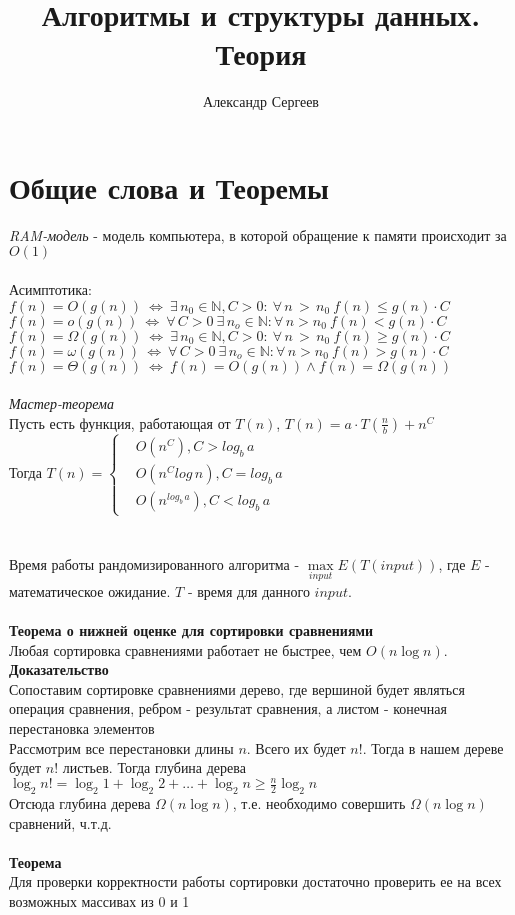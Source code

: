\documentclass[12pt]{article}
\title{Алгоритмы и структуры данных. Теория}
\author{Александр Сергеев}
\date{}
\begin{document}
\maketitle
\section{Общие слова и Теоремы}
\textit{RAM-модель} - модель компьютера, в которой обращение к памяти происходит за $O(1)$\\\\
Асимптотика:\\
$f(n) = O(g(n))\ \Leftrightarrow\ \exists\,n_0 \in \mathbb{N}, C > 0:\ \forall\,n\,>\,n_0\ f(n) \leq g(n)\cdot C$\\
$f(n) = o(g(n))\ \Leftrightarrow\ \forall\,C>0\ \exists\,n_o\in\mathbb{N}:\forall\,n>n_0\ f(n)<g(n)\cdot C$\\
$f(n) = \Omega(g(n))\ \Leftrightarrow\ \exists\,n_0 \in \mathbb{N}, C > 0:\ \forall\,n\,>\,n_0\ f(n) \geq g(n)\cdot C$\\
$f(n) = \omega(g(n))\ \Leftrightarrow\ \forall\,C>0\ \exists\,n_o\in\mathbb{N}:\forall\,n>n_0\ f(n)>g(n)\cdot C$\\
$f(n) = \Theta(g(n))\ \Leftrightarrow\ f(n) = O(g(n)) \land f(n) = \Omega(g(n))$\\\\
\textit{Мастер-теорема}\\
Пусть есть функция, работающая от $T(n)$, $T(n)=a\cdot T(\frac{n}{b})+n^C$\\
Тогда $T(n)=
\left\{
\begin{array}{ll}
     & O(n^C), C > log_b\,a \\
     & O(n^Clog\,n), C = log_b\,a \\
     & O(n^{log_b\,a}), C < log_b\,a
\end{array}
\right.$\\\\\\
Время работы рандомизированного алгоритма - $\max\limits_{input} E(T(input))$, где $E$ - математическое ожидание. $T$ - время для данного $input$.\\\\
\textbf{Теорема о нижней оценке для сортировки сравнениями}\\
Любая сортировка сравнениями работает не быстрее, чем $O(n\log n)$.\\
\textbf{Доказательство}\\
Сопоставим сортировке сравнениями дерево, где вершиной будет являться операция сравнения, ребром - результат сравнения, а листом - конечная перестановка элементов\\
Рассмотрим все перестановки длины $n$. Всего их будет $n!$. Тогда в нашем дереве будет $n!$ листьев. Тогда глубина дерева $\log_2{n!} = \log_2 1 + \log_2 2 + \ldots + \log_2 n \geq \frac n2 \log_2 n$\\
Отсюда глубина дерева $\Omega(n\log n)$, т.е. необходимо совершить $\Omega(n\log n)$ сравнений, ч.т.д.\\\\
\textbf{Теорема}\\
Для проверки корректности работы сортировки достаточно проверить ее на всех возможных массивах из 0 и 1
\end{document}
